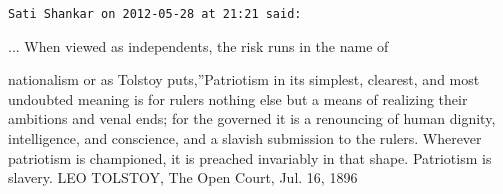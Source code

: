 \begin{footnotesize}
\begin{sffamily}
\hfill

\texttt{Sati Shankar on 2012-05-28 at 21:21 said:}

... When viewed as independents, the risk runs in the name of

nationalism or as Tolstoy puts,''Patriotism in its simplest, clearest, and most undoubted meaning is for rulers nothing else but a means of realizing their ambitions and venal ends; for the governed it is a renouncing of human dignity, intelligence, and conscience, and a slavish submission to the rulers. Wherever patriotism is championed, it is preached invariably in that shape. Patriotism is slavery. LEO TOLSTOY, The Open Court, Jul. 16, 1896

\end{sffamily}
\end{footnotesize}

